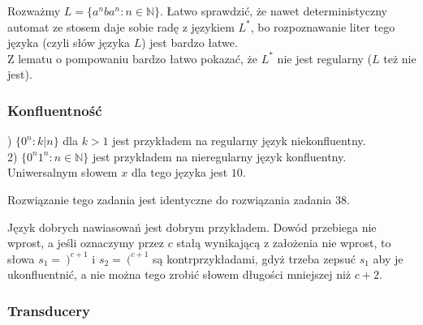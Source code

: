 \documentclass[a4paper,11pt]{article}
\newenvironment{zadanie}[1]
  {\renewcommand\theinnercustomthm{#1}\innercustomthm}
  {\endinnercustomthm}
\begin{document}
\begin{zadanie}{71}
\end{zadanie}
Rozważmy $L = \{ a^nba^n : n \in \mathbb{N}\}$. Łatwo sprawdzić, że nawet deterministyczny automat ze stosem daje sobie radę
z językiem $L^*$, bo rozpoznawanie liter tego języka (czyli słów języka $L$) jest bardzo łatwe. \\
Z lematu o pompowaniu bardzo łatwo pokazać, że $L^*$ nie jest regularny ($L$ też nie jest).


\subsubsection{Konfluentność}

\begin{zadanie}{74}
\end{zadanie}
1) $\{ 0^n : k|n \}$ dla $k>1$ jest przykładem na regularny język niekonfluentny. \\
2) $\{ 0^n1^n : n \in \mathbb{N} \}$ jest przykładem na nieregularny język konfluentny. Uniwersalnym słowem $x$ dla tego języka
jest $10$.

\begin{zadanie}{75}
\end{zadanie}
Rozwiązanie tego zadania jest identyczne do rozwiązania zadania 38.

\begin{zadanie}{76}
\end{zadanie}
Język dobrych nawiasowań jest dobrym przykładem. Dowód przebiega nie wprost, a jeśli oznaczymy przez $c$ stałą wynikającą
z założenia nie wprost, to słowa $s_1 = \ )^{c+1}$ i $s_2 = \ (^{c+1}$ są kontrprzykładami, gdyż trzeba zepsuć $s_1$ aby je
ukonfluentnić, a nie można tego zrobić słowem długości mniejszej niż $c+2$.

\subsubsection{Transducery}
\end{document}
